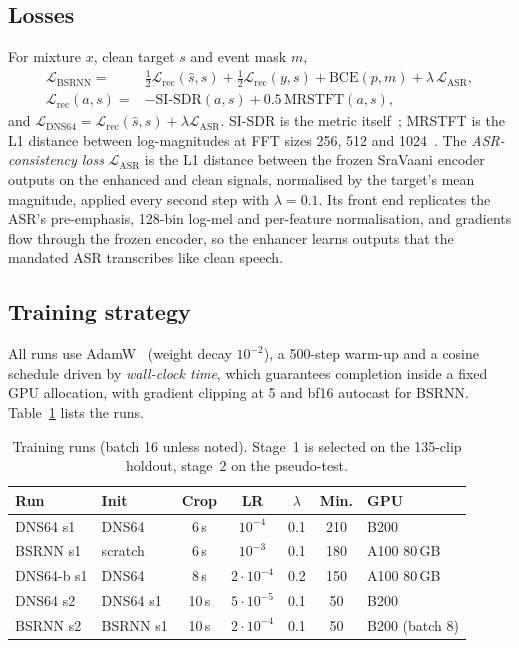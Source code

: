 \documentclass[conference]{IEEEtran}
\begin{document}
\subsection{Losses}
For mixture $x$, clean target $s$ and event mask $m$,
\begin{align}
\mathcal{L}_{\text{BSRNN}} ={}& \tfrac12\mathcal{L}_{\text{rec}}(\hat{s},s)+\tfrac12\mathcal{L}_{\text{rec}}(y,s)
+ \text{BCE}(p,m) + \lambda\,\mathcal{L}_{\text{ASR}},\\
\mathcal{L}_{\text{rec}}(a,s) ={}& -\text{SI-SDR}(a,s) + 0.5\,\text{MRSTFT}(a,s),
\end{align}
and $\mathcal{L}_{\text{DNS64}}=\mathcal{L}_{\text{rec}}(\hat{s},s)+\lambda\mathcal{L}_{\text{ASR}}$. SI-SDR is the
metric itself~\cite{sisdr}; MRSTFT is the L1 distance between log-magnitudes at FFT sizes 256, 512 and
1024~\cite{pwg}. The \emph{ASR-consistency loss} $\mathcal{L}_{\text{ASR}}$ is the L1 distance between the frozen
SraVaani encoder outputs on the enhanced and clean signals, normalised by the target's mean magnitude, applied every
second step with $\lambda=0.1$. Its front end replicates the ASR's pre-emphasis, 128-bin log-mel and per-feature
normalisation, and gradients flow through the frozen encoder, so the enhancer learns outputs that the mandated ASR
transcribes like clean speech.

\subsection{Training strategy}
All runs use AdamW~\cite{adamw} (weight decay $10^{-2}$), a 500-step warm-up and a cosine schedule driven by
\emph{wall-clock time}, which guarantees completion inside a fixed GPU allocation, with gradient clipping at 5 and
bf16 autocast for BSRNN. Table~\ref{tab:runs} lists the runs.

\begin{table}[t]
\centering
\caption{Training runs (batch 16 unless noted). Stage~1 is selected on the 135-clip holdout, stage~2 on the
pseudo-test.}
\label{tab:runs}
\footnotesize
\setlength{\tabcolsep}{2.6pt}
\begin{tabular}{llccccl}
\toprule
Run & Init & Crop & LR & $\lambda$ & Min. & GPU\\
\midrule
DNS64 s1 & DNS64 & 6\,s & $10^{-4}$ & 0.1 & 210 & B200\\
BSRNN s1 & scratch & 6\,s & $10^{-3}$ & 0.1 & 180 & A100 80\,GB\\
DNS64-b s1 & DNS64 & 8\,s & $2{\cdot}10^{-4}$ & 0.2 & 150 & A100 80\,GB\\
DNS64 s2 & DNS64 s1 & 10\,s & $5{\cdot}10^{-5}$ & 0.1 & 50 & B200\\
BSRNN s2 & BSRNN s1 & 10\,s & $2{\cdot}10^{-4}$ & 0.1 & 50 & B200 (batch 8)\\
\bottomrule
\end{tabular}
\end{table}
\end{document}
